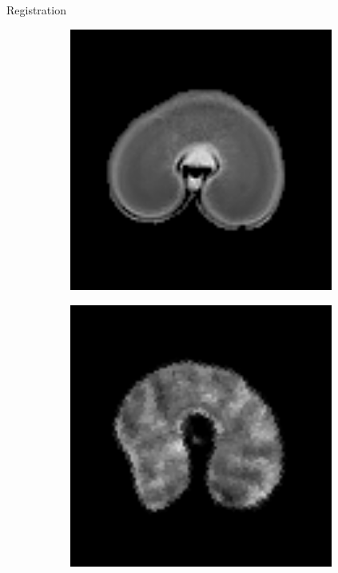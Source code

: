 \documentclass[10pt]{beamer}
\begin{document}
\begin{frame}{Registration}
  \begin{figure}[ht]
  \centering
  \begin{subfigure}[t]{0.25\textwidth}
    \centering
    \includegraphics[width=0.95\textwidth]{fig/registration_wheat_mri}
    \caption{}
    \label{subfig:registration_wheat_mri}
  \end{subfigure}%
  \begin{subfigure}[t]{0.25\textwidth}
    \centering
    \includegraphics[width=0.95\textwidth]{fig/registration_wheat_affine}

\end{subfigure}
\end{figure}
\end{frame}
\end{document}
